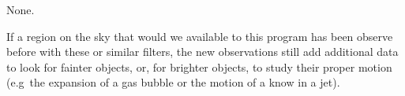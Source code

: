 \documentclass[12pt]{article}
\begin{document}
%
%
\coordinatedobs          %
None.


%
%
\duplications           %
If a region on the sky that would we available to this program has been observe before with these or similar filters, the new observations still add additional data to look for fainter objects, or, for brighter objects, to study their proper motion (e.g\ the expansion of a gas bubble or the motion of a know in a jet).


\end{document}
